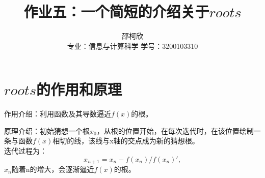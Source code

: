 \documentclass{ctexart}
\title{作业五：一个简短的介绍关于$roots$}
\author{邵柯欣 \\ 专业：信息与计算科学 学号：3200103310}
\begin{document}
\maketitle

\section{$roots$的作用和原理}

作用介绍：利用函数及其导数逼近$f(x)$的根。\par

原理介绍：初始猜想一个根$x_0$，从根的位置开始，在每次迭代时，在该位置绘制一条与函数$f(x)$相切的线，该线与x轴的交点成为新的猜想根。
\\迭代过程为：
\begin{equation}
  x_{n+1} = x_n-f(x_n)/f(x_n)',
\end{equation}
$x_n$随着n的增大，会逐渐逼近$f(x)$的根。
\end{document}
